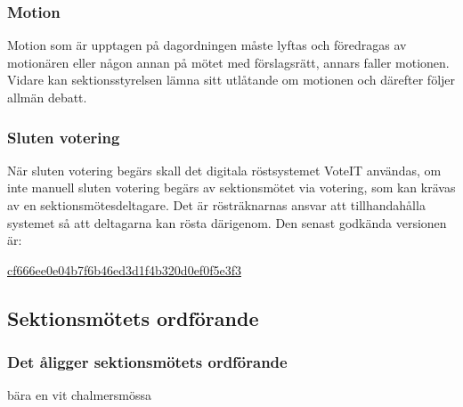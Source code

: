 \subsubsection{Motion}
Motion som är upptagen på dagordningen måste lyftas och föredragas av motionären eller någon annan på mötet med förslagsrätt, annars faller motionen. Vidare kan sektionsstyrelsen lämna sitt utlåtande om motionen och därefter följer allmän debatt.

\subsubsection{Sluten votering}
När sluten votering begärs skall det digitala röstsystemet VoteIT användas, om inte manuell sluten votering begärs av sektionsmötet via votering, som kan krävas av en sektionsmötesdeltagare. Det är rösträknarnas ansvar att tillhandahålla systemet så att deltagarna kan rösta därigenom. Den senast godkända versionen är:

\href{https://github.com/cthit/VoteIT/commit/cf666ee0e04b7f6b46ed3d1f4b320d0ef0f5e3f3}{cf666ee0e04b7f6b46ed3d1f4b320d0ef0f5e3f3}

\subsection{Sektionsmötets ordförande}

\subsubsection{Det åligger sektionsmötets ordförande}
\begin{att}
	\item  bära en vit chalmersmössa
\end{att}